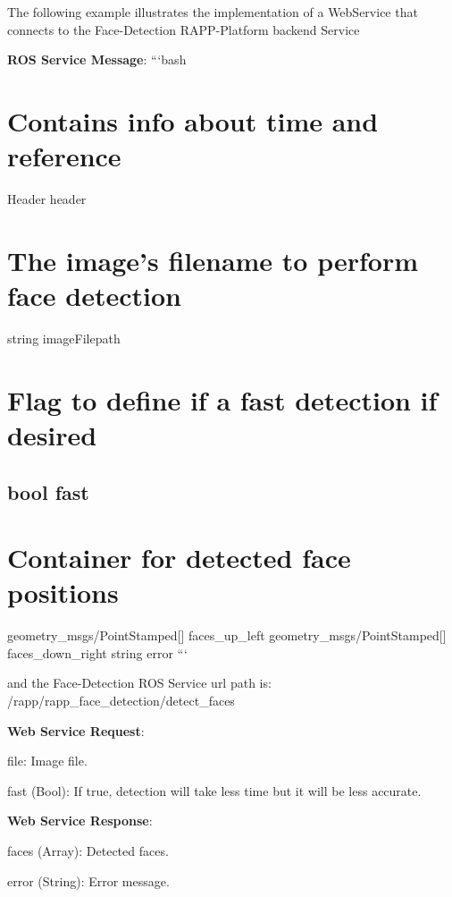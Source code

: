 The following example illustrates the implementation of a Web\-Service that connects to the Face-\/\-Detection R\-A\-P\-P-\/\-Platform backend Service

{\bfseries R\-O\-S Service Message}\-: ```bash \section*{Contains info about time and reference}

Header header \section*{The image's filename to perform face detection}

string image\-Filepath \section*{Flag to define if a fast detection if desired}

\subsection*{bool fast }

\section*{Container for detected face positions}

geometry\-\_\-msgs/\-Point\-Stamped\mbox{[}\mbox{]} faces\-\_\-up\-\_\-left geometry\-\_\-msgs/\-Point\-Stamped\mbox{[}\mbox{]} faces\-\_\-down\-\_\-right string error ```

and the Face-\/\-Detection R\-O\-S Service url path is\-: {\ttfamily /rapp/rapp\-\_\-face\-\_\-detection/detect\-\_\-faces}

{\bfseries Web Service Request}\-:


\begin{DoxyItemize}
\item {\ttfamily file}\-: Image file.
\item {\ttfamily fast} (Bool)\-: If true, detection will take less time but it will be less accurate.
\end{DoxyItemize}

{\bfseries Web Service Response}\-:


\begin{DoxyItemize}
\item {\ttfamily faces} (Array)\-: Detected faces.
\item {\ttfamily error} (String)\-: Error message.
\end{DoxyItemize}

